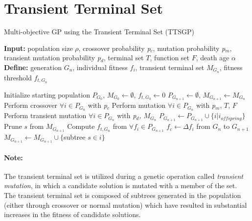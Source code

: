 \documentclass[a4paper]{article}
\begin{document}
\section{Transient Terminal Set}
\begin{algorithm}
	\caption{Multi-objective GP using the Transient Terminal Set (TTSGP)}
	\hspace*{\algorithmicindent} \textbf{Input:} population size \(\rho\), crossover probability \textit{p$_{c}$}, mutation probability \textit{p$_{m}$}, transient mutation probability \textit{p$_{d}$}, terminal set \(T\), function set \(F\), death age \(\alpha\) \\
	\hspace*{\algorithmicindent} \textbf{Define:} generation \(G_{n}\), individual fitness \(f_{i}\), transient terminal set \(M_{G_{n}}\), fitness threshold \(f_{t, G_{n}}\) \\ 
	\begin{algorithmic}[1]
		\State Initialize starting population \textit{$ P_{G_{0}} $}, \(M_{G_{0}}\leftarrow \emptyset\), \(f_{t, G_{0}} \leftarrow 0\)
		 
		\State \(P_{G_{n+1}}\leftarrow \emptyset\), \(M_{G_{n+1}}\leftarrow M_{G_{n}}\)
			
		\State Perform crossover $\forall i\in P_{G_{n}}$ with \textit{p$_{c}$}
		\State Perform mutation $\forall i\in P_{G_{n}}$ with \textit{p$_{m}$}, \(T\), \(F\)
		\State Perform transient mutation $\forall i\in P_{G_{n}}$ with \textit{p$_{d}$, \(M_{G_{n}}\)}
		\State $P_{G_{n+1}} \leftarrow P_{G_{n+1}}\cup \{i | i_{offspring}\}$
		\EndWhile\newline
			
		\State Prune \(s\) from \(M_{G_{n+1}}\)
		\EndIf
		\EndFor
		\State Compute $f_{t, G_{n}}$ from $\forall f_{i} \in P_{G_{n+1}}$
		\State $f_{c}\leftarrow \Delta f_{i}$ from \(G_{n}\) to \(G_{n+1}\)
		\State \(M_{G_{n+1}} \leftarrow M_{G_{n+1}} \cup \{\)subtree \(s\in i \}\)
		\EndIf
		\EndFor 
		\EndWhile
\end{algorithmic}\end{algorithm}
\paragraph{Note:} The transient terminal set is utilized during a genetic operation called \textit{transient mutation}, in which a candidate solution is mutated with a member of the set. The transient terminal set is composed of subtrees generated in the population (either through crossover or normal mutation) which have resulted in substantial increases in the fitness of candidate solutions.
\end{document}
